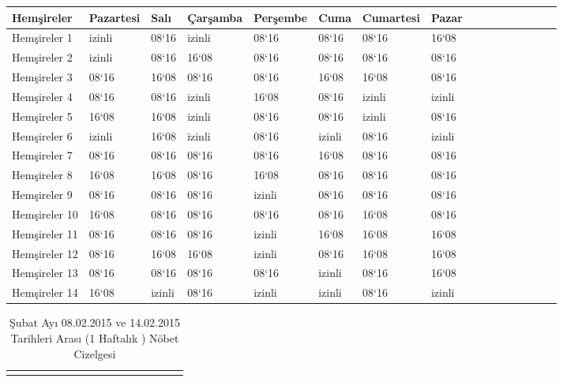 \documentclass[12pt, a4paper]{article}
\begin{document}
\begin{flushleft}
\begin{center}
\begin{landscape}
\begin{table}
\begin{tabular}{|p{3cm}||p{2cm}||p{2cm}||p{3cm}||p{3cm}||p{3cm}||p{3cm}||p{2cm}|c|c|c|c|c|c|c|c|}
				\hline Hemşireler   & Pazartesi& Salı & Çarşamba & Perşembe &Cuma&Cumartesi &Pazar\\
				\hline Hemşireler 1 &  izinli & 08`16  & izinli &  08`16  &  08`16  & 08`16   &  16`08 \\
				\hline Hemşireler 2 &  izinli & 08`16  & 16`08  &  08`16  &  08`16  & 08`16   &  08`16 \\
				\hline Hemşireler 3 &  08`16  & 16`08  & 08`16  &  08`16  &  16`08  & 16`08   &  08`16 \\
				\hline Hemşireler 4 &  08`16  & 08`16  & izinli &  16`08  &  08`16  & izinli  &  izinli \\
				\hline Hemşireler 5 &  16`08  & 16`08  & izinli &  08`16  &  08`16  & izinli  &  08`16 \\
				\hline Hemşireler 6 &  izinli & 16`08  & izinli &  08`16  &  izinli & 08`16   &  izinli \\
				\hline Hemşireler 7 &  08`16  & 08`16  & 08`16  &  08`16  &  16`08  & 08`16   &  08`16 \\
				\hline Hemşireler 8 &  16`08  & 16`08  & 08`16  &  16`08  &  08`16  & 08`16   &  08`16 \\
				\hline Hemşireler 9 &  08`16  & 08`16  & 08`16  &  izinli &  08`16  & 08`16   &  08`16 \\
				\hline Hemşireler 10 & 16`08  & 08`16  & 08`16  &  08`16  &  08`16  & 16`08   &  08`16 \\
				\hline Hemşireler 11 & 08`16  & 08`16  & 08`16  &  izinli &  16`08  & 16`08   &  16`08 \\
				\hline Hemşireler 12 & 08`16  & 16`08  & 16`08  &  izinli &  08`16  & 16`08   &  16`08 \\
				\hline Hemşireler 13 & 08`16  & 08`16  & 08`16  &  08`16  &  izinli & 08`16   &  16`08 \\
				\hline Hemşireler 14 & 16`08  & izinli & 08`16  &  izinli & izinli &  08`16   &  izinli \\
				\hline
				
			\end{tabular}
			
		\end{table}
		
		\begin{table}
			\caption{{Şubat Ayı 08.02.2015 ve 14.02.2015  Tarihleri Arası (1 Haftalık ) Nöbet Cizelgesi}}
			\begin{tabular}{|p{3cm}||p{2cm}||p{2cm}||p{3cm}||p{3cm}||p{3cm}||p{3cm}||p{2cm}|c|c|c|c|c|c|c|c|}
				\rowcolor{red}
				

\end{tabular}
\end{table}
\end{landscape}
\end{center}
\end{flushleft}
\end{document}
